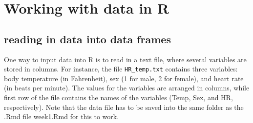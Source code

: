 \documentclass[
  letterpaper,
  DIV=11,
  numbers=noendperiod]{scrreprt}
\newenvironment{Shaded}{\begin{snugshade}}{\end{snugshade}}
\newcommand{\AttributeTok}[1]{\textcolor[rgb]{0.40,0.45,0.13}{#1}}
\newcommand{\ConstantTok}[1]{\textcolor[rgb]{0.56,0.35,0.01}{#1}}
\newcommand{\DecValTok}[1]{\textcolor[rgb]{0.68,0.00,0.00}{#1}}
\newcommand{\FunctionTok}[1]{\textcolor[rgb]{0.28,0.35,0.67}{#1}}
\newcommand{\NormalTok}[1]{\textcolor[rgb]{0.00,0.23,0.31}{#1}}
\newcommand{\OtherTok}[1]{\textcolor[rgb]{0.00,0.23,0.31}{#1}}
\newcommand{\SpecialCharTok}[1]{\textcolor[rgb]{0.37,0.37,0.37}{#1}}
\newcommand{\StringTok}[1]{\textcolor[rgb]{0.13,0.47,0.30}{#1}}
\begin{document}
\hypertarget{working-with-data-in-r}{%
\section{Working with data in R}\label{working-with-data-in-r}}

\label{sec:comp3}

\hypertarget{reading-in-data-into-data-frames}{%
\subsection{reading in data into data
frames}\label{reading-in-data-into-data-frames}}

One way to input data into R is to read in a text file, where several
variables are stored in columns. For instance, the file
\texttt{HR\_temp.txt} contains three variables: body temperature (in
Fahrenheit), sex (1 for male, 2 for female), and heart rate (in beats
per minute). The values for the variables are arranged in columns, while
first row of the file contains the names of the variables (Temp, Sex,
and HR, respectively). Note that the data file has to be saved into the
same folder as the .Rmd file week1.Rmd for this to work.

\begin{Shaded}
\end{Shaded}
\end{document}
